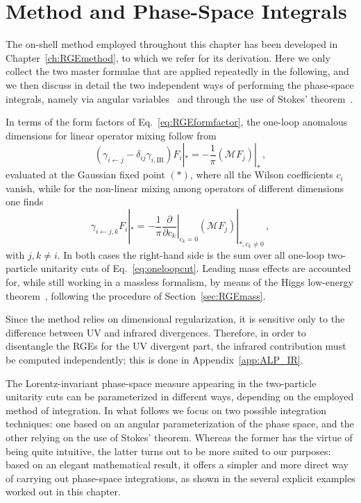 \section{Method and Phase-Space Integrals}
\label{sec:ALPmethod}

The on-shell method employed throughout this chapter has been developed in
Chapter~\ref{ch:RGEmethod}, to which we refer for its derivation. Here we only collect the two
master formulae that are applied repeatedly in the following, and we then discuss in detail the two
independent ways of performing the phase-space integrals, namely via angular
variables~\cite{Zwiebel:2011bx} and through the use of Stokes' theorem~\cite{Mastrolia:2009dr}.

In terms of the form factors of Eq.~\eqref{eq:RGEformfactor}, the one-loop anomalous dimensions for
linear operator mixing follow from~\cite{Caron-Huot:2016cwu,EliasMiro:2020tdv}
\begin{equation}
\label{eq:ALPmasterformula}
\left(
\gamma_{i \leftarrow j}
-\delta_{ij}\gamma_{i,\text{IR}}
\right)
F_i|_{*} = -\frac{1}{\pi}(\mathcal M F_j)|_{*}\,,
\end{equation}
evaluated at the Gaussian fixed point $(*)$, where all the Wilson coefficients $c_i$ vanish, while
for the non-linear mixing among operators of different dimensions one
finds~\cite{Bresciani:2023jsu}
\begin{equation}
\label{eq:ALPmastergammaijk}
\gamma_{i\leftarrow j,k}F_i|_{*} = -\frac{1}{\pi}\left.\frac{\partial}{\partial c_k}\right|_{c_k=0}(\mathcal M F_j)|_{*,c_k\neq 0} \,,
\end{equation}
with $j,k\neq i$. In both cases the right-hand side is the sum over all one-loop two-particle
unitarity cuts of Eq.~\eqref{eq:oneloopcut}. Leading mass effects are accounted for, while still
working in a massless formalism, by means of the Higgs low-energy
theorem~\cite{Ellis:1975ap,Shifman:1979eb,Bresciani:2023jsu}, following the procedure of
Section~\ref{sec:RGEmass}.

Since the method relies on dimensional regularization, it is sensitive only to the difference
between UV and infrared divergences.
Therefore, in order to disentangle the RGEs for the UV
divergent part, the infrared contribution must be computed independently; this is done in
Appendix~\ref{app:ALP_IR}.

The Lorentz-invariant phase-space measure appearing in the two-particle unitarity cuts can be
parameterized in different ways, depending on the employed method of integration.
In what follows we focus on two possible integration techniques: one based on an angular
parameterization of the phase space, and the other relying on the use of Stokes' theorem.
Whereas the former has the virtue of being quite intuitive, the latter turns out to be more
suited to our purposes: based on an elegant mathematical result, it offers a simpler and more
direct way of carrying out phase-space integrations, as shown in the several explicit examples
worked out in this chapter.

